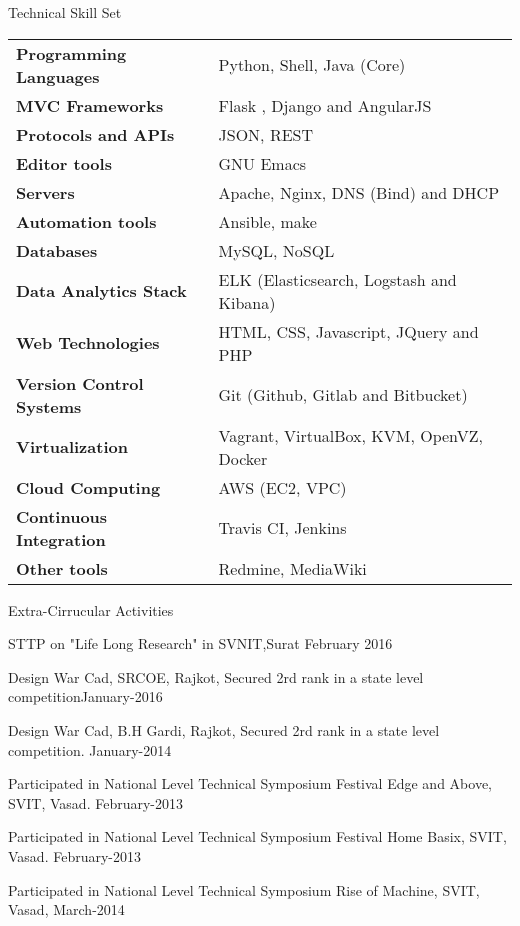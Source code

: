 \documentclass{resume} %
\begin{document}
\begin{rSection}
{Technical Skill Set}

\begin{tabular}{ @{} >{\bfseries}l @{\hspace{6ex}} l }
Programming Languages & Python, Shell, Java (Core) \\
MVC Frameworks & Flask , Django and AngularJS\\
Protocols and APIs & JSON, REST \\
Editor tools & GNU Emacs \\
Servers & Apache, Nginx, DNS (Bind) and DHCP \\  
Automation tools & Ansible, make \\
Databases &  MySQL, NoSQL \\
Data Analytics Stack & ELK (Elasticsearch, Logstash and Kibana) \\
Web Technologies & HTML, CSS, Javascript, JQuery and PHP \\
Version Control Systems & Git (Github, Gitlab and Bitbucket) \\
Virtualization & Vagrant, VirtualBox, KVM, OpenVZ, Docker \\
Cloud Computing & AWS (EC2, VPC) \\
Continuous Integration & Travis CI, Jenkins \\
Other tools & Redmine, MediaWiki

\end{tabular}

\end{rSection}


\begin{rSection}{Extra-Cirrucular Activities} \itemsep -1pt {}   
\item STTP on "Life Long Research" in SVNIT,Surat \hfill February 2016
\item Design War Cad, SRCOE, Rajkot, Secured 2rd rank in a state level competition\hfill January-2016
\item  Design War Cad, B.H Gardi, Rajkot, Secured 2rd rank in a
state level competition. \hfill January-2014 
\item Participated in National Level Technical Symposium Festival Edge and Above, SVIT, Vasad. \hfill February-2013
\item Participated in National Level Technical Symposium Festival Home Basix, SVIT, Vasad.
 \hfill  February-2013 
\item Participated in National Level Technical Symposium Rise of Machine, SVIT, Vasad,  \hfill March-2014 
 

\end{rSection}
\end{document}
